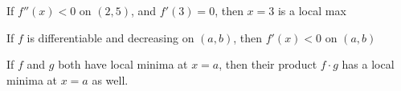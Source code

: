 \documentclass[handout]{ximera}
\begin{document}
\begin{exercise}
If $f''(x)<0$ on $(2,5)$, and $f'(3)=0$, then $x=3$ is a local max
	\begin{multipleChoice}	
	\end{multipleChoice}
\end{exercise}

\begin{exercise}
If $f$ is differentiable and decreasing on $(a,b)$, then $f'(x)<0$ on $(a,b)$

	\begin{multipleChoice}	
		\choice{True}
		\choice[correct]{False}
	\end{multipleChoice}
\end{exercise}

\begin{exercise}
If $f$ and $g$ both have local minima at $x=a$, then their product $f\cdot g$ has a local minima at $x=a$ as well.

\begin{multipleChoice}	
\end{multipleChoice}
\end{exercise}
\end{document}
